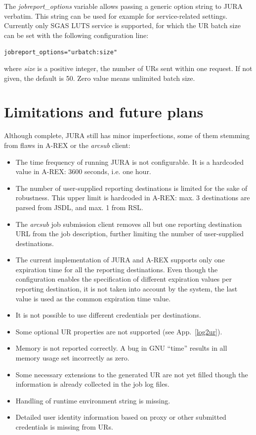 \documentclass{article}                            %
\begin{document}
The \textit{jobreport\_options} variable allows passing a generic
option string to JURA verbatim. This string can be used for example
for service-related settings. Currently only SGAS LUTS service is
supported, for which the UR batch size can be set with the following
configuration line:

\verb|jobreport_options="urbatch:size"|

where \textit{size} is a positive integer, the number of URs sent
within one request. If not given, the default is 50. Zero value means
unlimited batch size.



\section{Limitations and future plans}
\label{future}
Although complete, JURA still has minor imperfections, some of them
stemming from flaws in A-REX or the \textit{arcsub} client:

\begin{itemize}
\item The time frequency of running JURA is not configurable. It is a
  hardcoded value in A-REX: 3600 seconds, i.e. one hour. 
\item The number of user-supplied reporting destinations is limited
  for the sake of robustness. This upper limit is hardcoded in A-REX:
  max. 3 destinations are parsed from JSDL, and max. 1 from RSL.
\item The \textit{arcsub} job submission client removes all but one
  reporting destination URL from the job description, further limiting
  the number of user-supplied destinations.
\item The current implementation of JURA and A-REX supports only one
  expiration time for all the reporting destinations. Even though the
  configuration enables the specification of different expiration
  values per reporting destination, it is not taken into account by
  the system, the last value is used as the common expiration time
  value.
\item It is not possible to use different credentials per destinations.
\item Some optional UR properties are not supported (see
  App.~\ref{log2ur}).
\item Memory is not reported correctly. A bug in GNU ``time'' results
  in all memory usage set incorrectly as zero.
\item Some necessary extensions to the generated UR are not yet filled
  though the information is already collected in the job log files.
\item Handling of runtime environment string is missing.
\item Detailed user identity information based on proxy or other
  submitted credentials is missing from URs.
\end{itemize}
\end{document}
